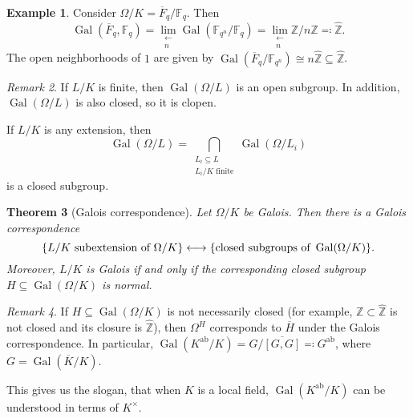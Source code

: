 \documentclass[leqno, openany]{memoir}
\newtheorem{thm}{Theorem}[section]
\theoremstyle{definition}
\newtheorem{exm}[thm]{Example}
\theoremstyle{remark}
\newtheorem{rmk}[thm]{Remark}
\theoremstyle{plain}
\theoremstyle{definition}
\theoremstyle{remark}
\newcommand{\F}{\mathbb{F}}
\newcommand{\Z}{\mathbb{Z}}
\newcommand{\mr}[1]{\mathrm{#1}}
\newcommand{\ol}[1]{\overline{#1}}
\newcommand{\wh}[1]{\widehat{#1}}
\DeclareMathOperator{\Gal}{Gal}
\begin{document}
\begin{exm}
    Consider $\Omega / K = \ol{F}_q / \F_q$. Then 
    \[ \Gal(\ol{F}_q, \F_q) = \lim_{\substack{\longleftarrow \\ n}} \Gal(\F_{q^n} / \F_q) = \lim_{\substack{\longleftarrow \\ n}} \Z/n\Z \eqqcolon \wh{\Z}. \]
    The open neighborhoods of $1$ are given by $\Gal(\ol{F}_q / \F_{q^n}) \cong n \wh{\Z} \subseteq \wh{\Z}$.
\end{exm}

\begin{rmk}
    If $L/K$ is finite, then $\Gal(\Omega / L)$ is an open subgroup. In addition, $\Gal(\Omega / L)$ is also closed, so it is clopen.

    If $L/K$ is any extension, then 
    \[ \Gal(\Omega / L) = \bigcap_{\substack{L_i \subseteq L \\ L_i/K \text{ finite}}} \Gal(\Omega / L_i) \]
    is a closed subgroup.
\end{rmk}

\begin{thm}[Galois correspondence]
    Let $\Omega / K$ be Galois. Then there is a Galois correspondence
    \[ \qty{L/K \text{ subextension of }\Omega /K} \longleftrightarrow \qty{\text{closed subgroups of } \Gal(\Omega/K)}. \]
    Moreover, $L/K$ is Galois if and only if the corresponding closed subgroup $H \subseteq \Gal(\Omega /K)$ is normal.
\end{thm}

\begin{rmk}
    If $H \subseteq \Gal(\Omega /K)$ is not necessarily closed (for example, $\Z \subset \wh{\Z}$ is not closed and its closure is $\wh{\Z}$), then $\Omega^H$ corresponds to $\ol{H}$ under the Galois correspondence. In particular, $\Gal(K^{\mr{ab}}/K) = G/\ol{[G,G]} \eqqcolon G^{\mr{ab}}$, where $G = \Gal(\ol{K} / K)$.

    This gives us the slogan, that when $K$ is a local field, $\Gal(K^{\mr{ab}}/K)$ can be understood in terms of $K^{\times}$.
\end{rmk}
\end{document}
